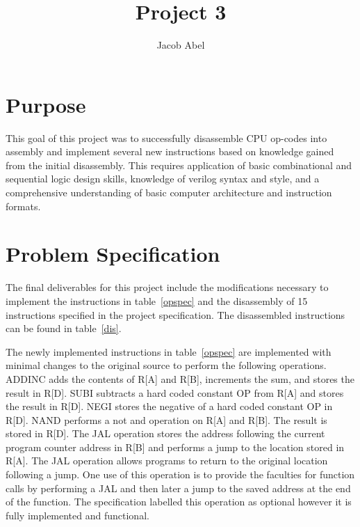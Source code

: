 \documentclass[12pt,letterpaper,titlepage]{article}
\author{Jacob Abel}
\title{Project 3}
\begin{document}
\maketitle


\tableofcontents
\pagebreak
\listoftables

\listoffigures

\pagebreak
\begin{raggedright}

\section{Purpose}
This goal of this project was to successfully disassemble CPU op-codes into assembly and implement several new instructions based on knowledge gained from the initial disassembly. This requires application of basic combinational and sequential logic design skills, knowledge of verilog syntax and style, and a comprehensive understanding of basic computer architecture and instruction formats.

\section{Problem Specification}
The final deliverables for this project include the modifications necessary to implement the instructions in table~\ref{opspec} and the disassembly of 15 instructions specified in the project specification. The disassembled instructions can be found in table~\ref{dis}. 

The newly implemented instructions in table~\ref{opspec} are implemented with minimal changes to the original source to perform the following operations. ADDINC adds the contents of R[A] and R[B], increments the sum, and stores the result in R[D]. SUBI subtracts a hard coded constant OP from R[A] and stores the result in R[D]. NEGI stores the negative of a hard coded constant OP in R[D]. NAND performs a not and operation on R[A] and R[B]. The result is stored in R[D]. The JAL operation stores the address following the current program counter address in R[B] and performs a jump to the location stored in R[A]. The JAL operation allows programs to return to the original location following a jump. One use of this operation is to provide the faculties for function calls by performing a JAL and then later a jump to the saved address at the end of the function. The specification labelled this operation as optional however it is fully implemented and functional.


\end{raggedright}
\end{document}
